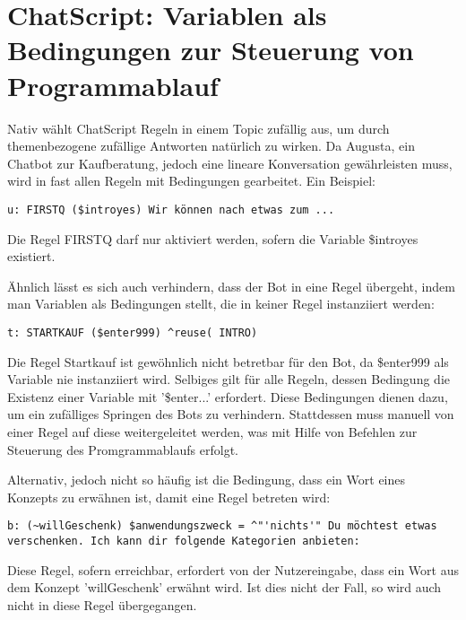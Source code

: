 \section{ChatScript: Variablen als Bedingungen zur Steuerung von Programmablauf}
\label{sec:ChatScript: Variablen als Bedingungen zur Steuerung von Programmablauf}

Nativ wählt ChatScript Regeln in einem Topic zufällig aus, um durch themenbezogene zufällige Antworten natürlich zu wirken. Da Augusta, ein Chatbot zur Kaufberatung, jedoch eine lineare Konversation gewährleisten muss, wird in fast allen Regeln mit Bedingungen gearbeitet. Ein Beispiel: 

\begin{lstlisting}[caption={Regelkopf von FIRSTQ in kaufabsicht.top}]
u: FIRSTQ ($introyes) Wir können nach etwas zum ... 
\end{lstlisting}

Die Regel FIRSTQ darf nur aktiviert werden, sofern die Variable \$introyes existiert. 

Ähnlich lässt es sich auch verhindern, dass der Bot in eine Regel übergeht, indem man Variablen als Bedingungen stellt, die in keiner Regel instanziiert werden:

\begin{lstlisting}[caption={Regelkopf von STARTKAUF in kaufabsicht.top}]
t: STARTKAUF ($enter999) ^reuse( INTRO)
\end{lstlisting}

Die Regel Startkauf ist gewöhnlich nicht betretbar für den Bot, da \$enter999 als Variable nie instanziiert wird. Selbiges gilt für alle Regeln, dessen Bedingung die Existenz einer Variable mit '\$enter...' erfordert. Diese Bedingungen dienen dazu, um ein zufälliges Springen des Bots zu verhindern. Stattdessen muss manuell von einer Regel auf diese weitergeleitet werden, was mit Hilfe von Befehlen zur Steuerung des Promgrammablaufs erfolgt. 

Alternativ, jedoch nicht so häufig ist die Bedingung, dass ein Wort eines Konzepts zu erwähnen ist, damit eine Regel betreten wird:

\begin{lstlisting}[caption={Regelkopf einer Regel in kaufabsicht.top}]
b: (~willGeschenk) $anwendungszweck = ^"'nichts'" Du möchtest etwas verschenken. Ich kann dir folgende Kategorien anbieten:
\end{lstlisting}

Diese Regel, sofern erreichbar, erfordert von der Nutzereingabe, dass ein Wort aus dem Konzept 'willGeschenk' erwähnt wird. Ist dies nicht der Fall, so wird auch nicht in diese Regel übergegangen.

